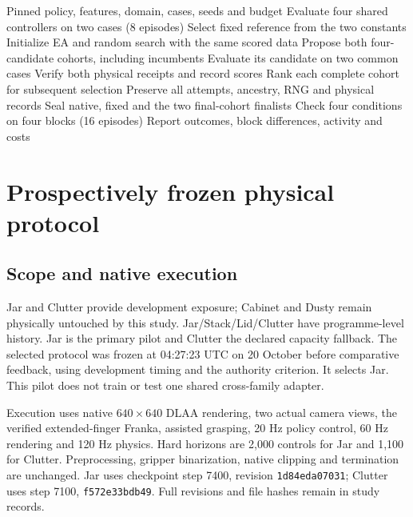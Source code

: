 \documentclass[sigconf,dvipsnames,balance=false]{acmart}
\begin{document}
\begin{algorithm}[t]
\caption{Frozen comparison after four development episodes}
\label{alg:comparison}
\begin{algorithmic}[1]
\Require Pinned policy, features, domain, cases, seeds and budget
\State Evaluate four shared controllers on two cases (8 episodes)
\State Select fixed reference from the two constants
\State Initialize EA and random search with the same scored data
 \State Propose both four-candidate cohorts, including incumbents
   \State Evaluate its candidate on two common cases
   \State Verify both physical receipts and record scores
  \EndFor
 \EndFor
 \State Rank each complete cohort for subsequent selection
 \State Preserve all attempts, ancestry, RNG and physical records
\EndFor
\State Seal native, fixed and the two final-cohort finalists
\State Check four conditions on four blocks (16 episodes)
\State Report outcomes, block differences, activity and costs
\end{algorithmic}
\end{algorithm}

\section{Prospectively frozen physical protocol}
\subsection{Scope and native execution}
Jar and Clutter provide development exposure; Cabinet and Dusty remain physically
untouched by this study. Jar/Stack/Lid/Clutter have programme-level history.
Jar is the primary pilot and Clutter the declared capacity fallback. The selected
protocol was frozen at 04:27:23 UTC on 20 October before comparative feedback,
using development timing and the authority criterion. It selects Jar. This pilot
does not train or test one shared cross-family adapter.

Execution uses native $640\times640$ DLAA rendering, two actual camera views,
the verified extended-finger Franka, assisted grasping, 20 Hz policy control,
60 Hz rendering and 120 Hz physics. Hard horizons are 2,000 controls for Jar and
1,100 for Clutter. Preprocessing, gripper binarization, native clipping and
termination are unchanged. Jar uses checkpoint step 7400, revision
\texttt{1d84eda07031}; Clutter uses step 7100, \texttt{f572e33bdb49}.
Full revisions and file hashes remain in study records.
\end{document}
